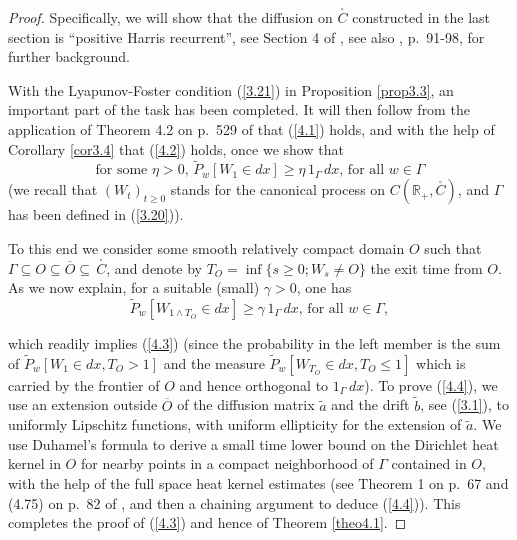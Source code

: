 \documentclass[12pt,leqno]{article}
\def\IR{{\mathbb R}}
\def\n{\noindent}
\def\ov{\overline}
\def\wt{\widetilde}
\begin{document}
\begin{proof}
Specifically, we will show that the diffusion on $\stackrel{_\circ}{C}$ constructed in the last section is ``positive Harris recurrent'', see Section 4 of \cite{MeynTwee93}, see also \cite{Lind92}, p.~91-98, for further background.

\medskip
With the Lyapunov-Foster condition (\ref{3.21}) in Proposition \ref{prop3.3}, an important part of the task has been completed. It will then follow from the application of Theorem 4.2 on p.~529 of \cite{MeynTwee93} that (\ref{4.1}) holds, and with the help of Corollary \ref{cor3.4} that (\ref{4.2}) holds, once we show that
\begin{equation}\label{4.3}
\mbox{for some $\eta > 0$, $\wt{P}_w[W_1 \in dx] \ge \eta \, 1_\Gamma \, dx$, for all $w \in \Gamma$}
\end{equation}
(we recall that $(W_t)_{t \ge 0}$ stands for the canonical process on $C(\IR_+, {\stackrel{_\circ}{C}})$, and $\Gamma$ has been defined in (\ref{3.20})).

\medskip
To this end we consider some smooth relatively compact domain $O$ such that $\Gamma \subseteq O \subseteq \ov{O} \subseteq \, \stackrel{_\circ}{C}$, and denote by $T_O = \inf\{s \ge 0; W_s \not= O\}$ the exit time from $O$. As we now explain, for a suitable (small) $\gamma > 0$, one has
\begin{equation}\label{4.4}
\mbox{$\wt{P}_w [ W_{1 \wedge T_O} \in dx] \ge \gamma \, 1_\Gamma \, dx$, for all $w \in \Gamma$},
\end{equation}

\n
which readily implies (\ref{4.3}) (since the probability in the left member is the sum of $\wt{P}_w[W_1 \in dx, T_O > 1]$ and the measure $\wt{P}_w[W_{T_O} \in dx, T_O \le 1]$ which is carried by the frontier of $O$ and hence orthogonal to $1_\Gamma\, dx$). To prove (\ref{4.4}), we use an extension outside $\ov{O}$ of the diffusion matrix $\wt{a}$ and the drift $\wt{b}$, see (\ref{3.1}), to uniformly Lipschitz functions, with uniform ellipticity for the extension of $\wt{a}$. We use Duhamel's formula to derive a small time lower bound on the Dirichlet heat kernel in $O$ for nearby points in a compact neighborhood of $\Gamma$ contained in $O$, with the help of the full space heat kernel estimates (see Theorem 1 on p.~67 and (4.75) on p.~82 of \cite{IlinKalaOlei62}, and then a chaining argument to deduce (\ref{4.4})). This completes the proof of (\ref{4.3}) and hence of Theorem \ref{theo4.1}.
\end{proof}
\end{document}
